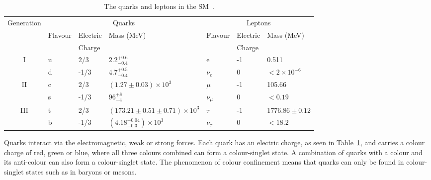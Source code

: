 \vspace{0.8cm}
\begin{table}[ht!]
\centering
\footnotesize
\begin{tabular}{|c|l|l|l|l|l|l|}
\hline
\multirow{2}{*}{Generation} & \multicolumn{3}{c|}{Quarks}                             & \multicolumn{3}{c|}{Leptons}              \\ \cline{2-7} 
                            & Flavour & Electric & Mass (MeV)                           & Flavour      & Electric & Mass (MeV)        \\
                            & & Charge &                            &       & Charge &         \\ \hline

\hline

\multirow{2}{*}{I}          & u       & 2/3    & $2.2^{+0.6}_{-0.4}$                  & e            & -1     & 0.511             \\
                            & d       & -1/3   & $4.7^{+0.5}_{-0.4}$                  & $\nu_{e}$    & 0      & $<2\times10^{-6}$ \\ \hline
\multirow{2}{*}{II}         & c       & 2/3    & $(1.27\pm 0.03)\times10^{3}$         & $\mu$        & -1     & 105.66            \\
                            & s       & -1/3   & $96^{+8}_{-4}$                       & $\nu_{\mu}$  & 0      & $<0.19$           \\ \hline
\multirow{2}{*}{III}        & t       & 2/3    & $(173.21\pm0.51\pm0.71)\times10^{3}$ & $\tau$       & -1     & $1776.86\pm0.12$  \\
                            & b       & -1/3   & $(4.18^{+0.04}_{-0.3})\times10^{3}$  & $\nu_{\tau}$ & 0      & $<18.2$           \\ \hline
\end{tabular}
\caption{The quarks and leptons in the SM~\cite{PDG2016}.}
\label{table:SMmatter}

\end{table}
Quarks interact via the electromagnetic, weak or strong forces. Each quark has an electric charge, as seen in Table~\ref{table:SMmatter}, and carries a colour charge of red, green or blue, where all three colours combined can form a colour-singlet state. A combination of quarks with a colour and its anti-colour can also form a colour-singlet state. The phenomenon of colour confinement means that quarks can only be found in colour-singlet states such as in baryons or mesons. 

